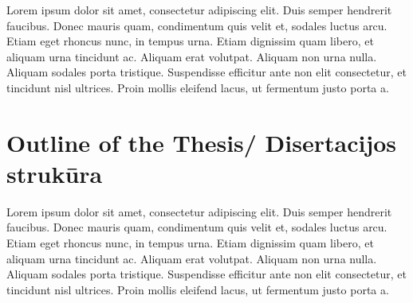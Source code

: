 Lorem ipsum dolor sit amet, consectetur adipiscing elit. Duis semper hendrerit faucibus. Donec mauris quam, condimentum quis velit et, sodales luctus arcu. Etiam eget rhoncus nunc, in tempus urna. Etiam dignissim quam libero, et aliquam urna tincidunt ac. Aliquam erat volutpat. Aliquam non urna nulla. Aliquam sodales porta tristique. Suspendisse efficitur ante non elit consectetur, et tincidunt nisl ultrices. Proin mollis eleifend lacus, ut fermentum justo porta a.


\section*{Outline of the Thesis/ Disertacijos strukūra}

Lorem ipsum dolor sit amet, consectetur adipiscing elit. Duis semper hendrerit faucibus. Donec mauris quam, condimentum quis velit et, sodales luctus arcu. Etiam eget rhoncus nunc, in tempus urna. Etiam dignissim quam libero, et aliquam urna tincidunt ac. Aliquam erat volutpat. Aliquam non urna nulla. Aliquam sodales porta tristique. Suspendisse efficitur ante non elit consectetur, et tincidunt nisl ultrices. Proin mollis eleifend lacus, ut fermentum justo porta a.